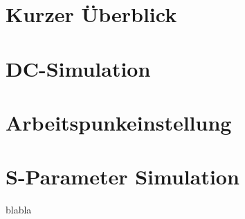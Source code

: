 
\section{Kurzer Überblick}
\section{DC-Simulation}
\section{Arbeitspunkeinstellung}
\section{S-Parameter Simulation}
blabla
\clearpage